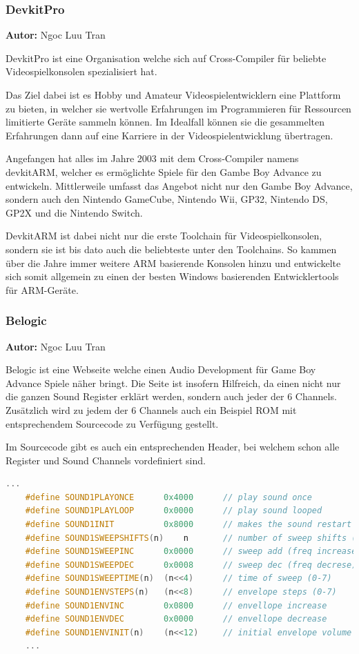 \documentclass[11pt,a4paper]{scrartcl}
\newcommand{\AutorNgoc} {
    \vspace{-4mm}
    \large \textbf{Autor:} Ngoc Luu Tran \normalsize
    \vspace{2mm}
}
\begin{document}

\subsubsection{DevkitPro}
\AutorNgoc

DevkitPro ist eine Organisation welche sich auf Cross-Compiler f\"ur beliebte Videospielkonsolen spezialisiert hat.

Das Ziel dabei ist es Hobby und Amateur Videospielentwicklern eine Plattform zu bieten, in welcher sie wertvolle Erfahrungen im Programmieren f\"ur Ressourcen limitierte Ger\"ate sammeln k\"onnen. Im Idealfall k\"onnen sie die gesammelten Erfahrungen dann auf eine Karriere in der Videospielentwicklung \"ubertragen.

Angefangen hat alles im Jahre 2003 mit dem Cross-Compiler namens devkitARM, welcher es erm\"oglichte Spiele f\"ur den Gambe Boy Advance zu entwickeln. Mittlerweile umfasst das Angebot nicht nur den Gambe Boy Advance, sondern auch den Nintendo GameCube, Nintendo Wii, GP32, Nintendo DS, GP2X und die Nintendo Switch. 

DevkitARM ist dabei nicht nur die erste Toolchain f\"ur Videospielkonsolen, sondern sie ist bis dato auch die beliebteste unter den Toolchains. So kammen \"uber die Jahre immer weitere ARM basierende Konsolen hinzu und entwickelte sich somit allgemein zu einen der besten Windows basierenden Entwicklertools f\"ur ARM-Ger\"ate. 


\subsubsection{Belogic}
\AutorNgoc
 
Belogic ist eine Webseite welche einen Audio Development f\"ur Game Boy Advance Spiele n\"aher bringt. Die Seite ist insofern Hilfreich, da einen nicht nur die ganzen Sound Register erkl\"art werden, sondern auch jeder der 6 Channels. Zus\"atzlich wird zu jedem der 6 Channels auch ein Beispiel ROM mit entsprechendem Sourcecode zu Verf\"ugung gestellt.

Im Sourcecode gibt es auch ein entsprechenden Header, bei welchem schon alle Register und Sound Channels vordefiniert sind.

\vspace{5mm}
\begin{lstlisting}[language=C++, caption={1. Ausschnitt aus Belogic gba.h}, label={list:gbaheader2}]
    ...
	#define SOUND1PLAYONCE		0x4000		// play sound once
	#define SOUND1PLAYLOOP		0x0000		// play sound looped
	#define SOUND1INIT			0x8000		// makes the sound restart
	#define SOUND1SWEEPSHIFTS(n)	n		// number of sweep shifts (0-7)
	#define SOUND1SWEEPINC		0x0000		// sweep add (freq increase)
	#define SOUND1SWEEPDEC		0x0008		// sweep dec (freq decrese)
	#define SOUND1SWEEPTIME(n)	(n<<4)		// time of sweep (0-7)
	#define SOUND1ENVSTEPS(n)	(n<<8)		// envelope steps (0-7)
	#define SOUND1ENVINC		0x0800		// envellope increase
	#define SOUND1ENVDEC		0x0000		// envellope decrease
	#define SOUND1ENVINIT(n)	(n<<12)		// initial envelope volume (0-15)
	...
\end{lstlisting}
\end{document}
